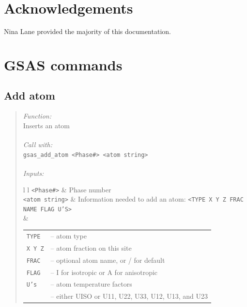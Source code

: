 \documentclass{article}
\begin{document}
\section{Acknowledgements}

Nina Lane provided the majority of this documentation.

\section{GSAS commands}

\subsection{Add atom}
\begin{quote}
\textit{Function:}\\ 
Inserts an atom\\ \\
\textit{Call with:}\\
\texttt{gsas\_add\_atom <Phase\#> <atom string>} \\ \\
\textit{Inputs:}\\
\begin{tabular}[t]{l l}
\texttt{<Phase\#>} & Phase number\\
\texttt{<atom string>} & Information needed to add an atom: \texttt{<TYPE X Y Z FRAC NAME FLAG U'S>} \\
	& \begin{tabular}[c]{l l}
	\texttt{TYPE} & -- atom type\\
	\texttt{X Y Z} & -- atom fraction on this site\\
	\texttt{FRAC} & -- optional atom name, or / for default\\
	\texttt{FLAG} & -- I for isotropic or A for anisotropic\\
	\texttt{U's} & -- atom temperature factors\\
		& -- either UISO or U11, U22, U33, U12, U13, and U23\\
	\end{tabular}
\end{tabular}
\end{quote}

\end{document}
